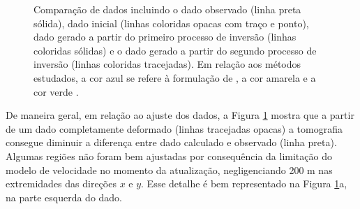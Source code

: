 \begin{figure}[H]
	\centering
	
	\caption{Comparação de dados incluindo o dado observado (linha preta sólida), dado inicial (linhas coloridas opacas com traço e ponto), dado gerado a partir do primeiro processo de inversão (linhas coloridas sólidas) e o dado gerado a partir do segundo processo de inversão (linhas coloridas tracejadas). Em relação aos métodos estudados, a cor azul se refere à formulação de , a cor amarela  e a cor verde .}
	\label{fig:zoom_out}
\end{figure}

De maneira geral, em relação ao ajuste dos dados, a Figura \ref{fig:zoom_out} mostra que a partir de um dado completamente deformado (linhas tracejadas opacas) a tomografia consegue diminuir a diferença entre dado calculado e observado (linha preta). Algumas regiões não foram bem ajustadas por consequência da limitação do modelo de velocidade no momento da atualização, negligenciando 200 m nas extremidades das direções $x$ e $y$. Esse detalhe é bem representado na Figura \ref{fig:zoom_out}a, na parte esquerda do dado.  

